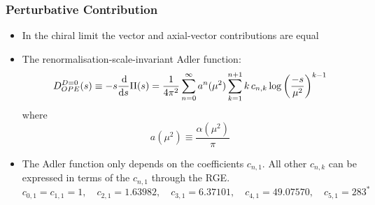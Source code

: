 \documentclass{beamer}
\begin{document}
\begin{frame}
  \frametitle{Perturbative Contribution}
  \begin{itemize}
  \item In the chiral limit the vector and axial-vector contributions are equal
  \item The renormalisation-scale-invariant Adler function:
    \begin{equation}
      D_{OPE}^{D=0}(s) \equiv -s \frac{\dif}{\dif s} \Pi(s)
      = \frac{1}{4 \pi^2} \sum_{n=0}^\infty a^n(\mu^2) \sum_{k=1}^{n+1} k\, c_{n,k} \log\left( \frac{-s}{\mu^2} \right)^{k-1}
    \end{equation}
    where
    \begin{equation}
      a(\mu^2) \equiv \frac{\alpha(\mu^2)}{\pi}
    \end{equation}
  \item The Adler function only depends on the coefficients \(c_{n,1}\). All
    other \(c_{n,k}\) can be expressed in terms of the \(c_{n,1}\) through the
    RGE.
    \begin{equation}
      c_{0,1} = c_{1,1} = 1, \quad c_{2,1} = 1.63982, \quad c_{3,1} = 6.37101, \quad c_{4,1} = 49.07570, \quad c_{5,1} = 283^*
    \end{equation}
  \end{itemize}
\end{frame}
\end{document}

